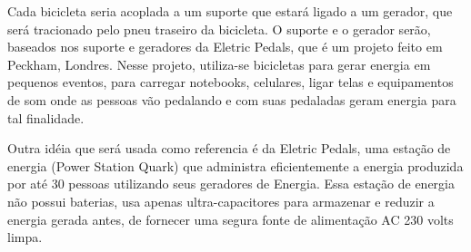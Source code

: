 	Cada bicicleta seria acoplada a um suporte que estará ligado a um gerador, que será tracionado pelo pneu traseiro da bicicleta. O suporte e o gerador serão, baseados nos suporte e geradores da Eletric Pedals, que é um projeto feito em Peckham, Londres. Nesse projeto, utiliza-se bicicletas para gerar energia em pequenos eventos, para carregar notebooks, celulares, ligar telas e equipamentos de som onde as pessoas vão pedalando e com suas pedaladas geram energia para tal finalidade.
	
	Outra idéia que será usada como referencia é da Eletric Pedals, uma estação de energia (Power Station Quark) que administra eficientemente a energia produzida por até 30 pessoas utilizando seus geradores de Energia. Essa estação de energia não possui baterias, usa apenas ultra-capacitores para armazenar e reduzir a energia gerada antes, de fornecer uma segura fonte de alimentação AC 230 volts limpa.

